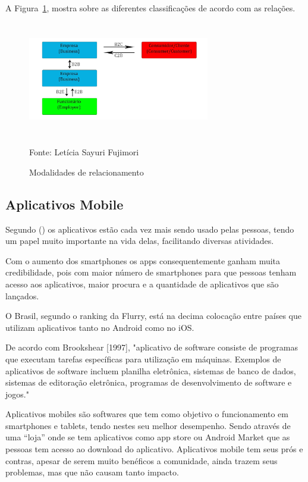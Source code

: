 A Figura~\hypersetup{linkcolor=black}\ref{fig:Modalidades}, mostra sobre as diferentes classificações de acordo com as relações.

 \begin{figure}[!h]
	\centering
	\caption{Modalidades de relacionamento}
	\label{fig:Modalidades}
	\includegraphics[width=300px, height=190px]{./images/2-7.jpg}
	\par{Fonte: Letícia Sayuri Fujimori}
\end{figure}

\subsection{Aplicativos Mobile}
Segundo (\cite{aplicativos-mobile}) os aplicativos estão cada vez mais sendo usado pelas pessoas, tendo um papel muito importante na vida delas, facilitando diversas atividades.

Com o aumento dos smartphones os apps consequentemente ganham muita credibilidade, pois com maior número de smartphones para que pessoas tenham acesso aos aplicativos, maior procura e a quantidade de aplicativos que são lançados.

O Brasil, segundo o ranking da Flurry, está na decima colocação entre países que utilizam aplicativos tanto no Android como no iOS.

De acordo com Brookshear [1997], "aplicativo de software consiste de programas que executam tarefas específicas para utilização em máquinas. Exemplos de aplicativos de software incluem planilha eletrônica, sistemas de banco de dados, sistemas de editoração eletrônica, programas de desenvolvimento de software e jogos."

Aplicativos mobiles são softwares que tem como objetivo o funcionamento em smartphones e tablets, tendo nestes seu melhor desempenho. Sendo através de uma “loja” onde se tem aplicativos como app store ou Android Market que as pessoas tem acesso ao download do aplicativo.
Aplicativos mobile tem seus prós e contras, apesar de serem muito benéficos a comunidade, ainda trazem seus problemas, mas que não causam tanto impacto.

